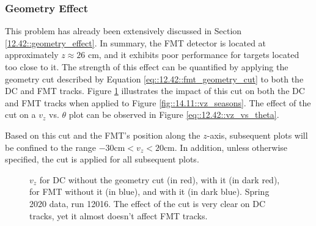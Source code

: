 \subsubsection{Geometry Effect}
\label{14.12::geometry_effect}
    This problem has already been extensively discussed in Section \ref{12.42::geometry_effect}.
    In summary, the FMT detector is located at approximately $z \approx 26$ cm, and it exhibits poor performance for targets located too close to it.
    The strength of this effect can be quantified by applying the geometry cut described by Equation \eqref{eq::12.42::fmt_geometry_cut} to both the DC and FMT tracks.
    Figure \ref{fig::14.12::vz_012016_geomcut} illustrates the impact of this cut on both the DC and FMT tracks when applied to Figure \ref{fig::14.11::vz_seasons}.
    The effect of the cut on a $v_z$ vs. $\theta$ plot can be observed in Figure \ref{eq::12.42::vz_vs_theta}.

    Based on this cut and the FMT's position along the $z$-axis, subsequent plots will be confined to the range $-30 \text{cm} < v_z < 20 \text{cm}$.
    In addition, unless otherwise specified, the cut is applied for all subsequent plots.

    \begin{figure}[h!]
        \caption[$v_z$ for DC and FMT, w/ and w/out the geometry cut]
        {$v_z$ for DC without the geometry cut (in red), with it (in dark red), for FMT without it (in blue), and with it (in dark blue).
        Spring 2020 data, run 12016.
        The effect of the cut is very clear on DC tracks, yet it almost doesn't affect FMT tracks.}
        \label{fig::14.12::vz_012016_geomcut}
    \end{figure}
